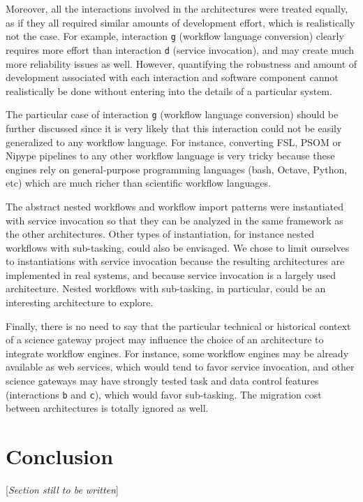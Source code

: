 \documentclass[preprint,3p,twocolumn]{elsarticle}
\newcommand{\todo}[1]{\color{blue}\xspace[\emph{#1}]\xspace\color{black}}
\begin{document}
Moreover, all the interactions involved in the architectures were
treated equally, as if they all required similar amounts of
development effort, which is realistically not the case. For example,
interaction \texttt{g} (workflow language conversion) clearly requires
more effort than interaction \texttt{d} (service invocation), and may
create much more reliability issues as well. However, quantifying the
robustness and amount of development associated with each interaction
and software component cannot realistically be done without entering
into the details of a particular system.

The particular case of interaction \texttt{g} (workflow language
conversion) should be further discussed since it is very likely that
this interaction could not be easily generalized to any workflow
language. For instance, converting FSL, PSOM or Nipype pipelines to
any other workflow language is very tricky because these engines rely
on general-purpose programming languages (bash, Octave, Python, etc)
which are much richer than scientific workflow languages.

The abstract nested workflows and workflow import patterns were
instantiated with service invocation so that they can be analyzed in
the same framework as the other architectures. Other types of
instantiation, for instance nested workflows with sub-tasking, could
also be envisaged. We chose to limit ourselves to instantiations with
service invocation because the resulting architectures are implemented in 
real systems, and because service invocation is a largely
used architecture. Nested workflows with sub-tasking, in particular,
could be an interesting architecture to explore. 

Finally, there is no need to say that the particular technical or
historical context of a science gateway project may influence the
choice of an architecture to integrate workflow engines. For instance,
some workflow engines may be already available as web services, which
would tend to favor service invocation, and other science gateways may
have strongly tested task and data control features (interactions
\texttt{b} and \texttt{c}), which would favor sub-tasking. The
migration cost between architectures is totally ignored as well.

\section{Conclusion}

\todo{Section still to be written}
\end{document}
